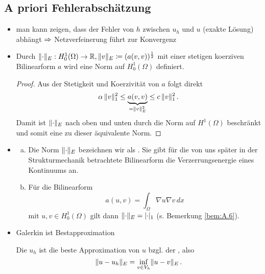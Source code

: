 \subsection{A priori Fehlerabschätzung}
\label{kap:2.3.1}

\begin{itemize}
\item man kann zeigen, dass der Fehler von $h$ zwischen $u_h$ und $u$ (exakte Lösung) abhängt $\Rightarrow$ Netzverfeinerung führt zur Konvergenz

\item \begin{lemma}
Durch $\lVert \cdot\rVert _E: H^1_0(\Omega) \rightarrow \mathbb{R}, \lVert v\rVert_E \coloneqq (a(v,v))^{\frac 1 2}$ mit einer stetigen koerziven Bilinearform $a$ wird eine Norm auf $H_0^1(\Omega)$ definiert.
\end{lemma}

\begin{proof}
Aus der Stetigkeit und Koerzivität von $a$ folgt direkt
\begin{align}\label{eq:2.12}
	\alpha \, \lVert v\rVert_1^2 \le \underbrace{a(v,v)}_{= \lVert v\rVert_E^2} \le c \, \lVert v\rVert_1^2 \, .
\end{align}
Damit ist $\lVert \cdot\rVert_E$ nach oben und unten durch die Norm auf $H^1(\Omega)$ beschränkt und somit eine zu dieser äquivalente Norm.
\end{proof}

\item \begin{bem*}
\begin{enumerate}[(a)]
\item Die Norm $\lVert \cdot\rVert_E$ bezeichnen wir als \textit{}. Sie gibt für die von uns später in der Strukturmechanik betrachtete Bilinearform  die Verzerrungsenergie eines Kontinuums an.
\item Für die Bilinearform
\[
	a(u,v) = \int_\Omega \nabla u \nabla v \, dx
\]
mit $u,v \in H^1_0(\Omega)$ gilt dann $\lVert \cdot\rVert_E = \lvert \cdot\rvert_1$ (s. Bemerkung \ref{bem:A.6}).
\end{enumerate}
\end{bem*}

\item Galerkin ist Bestapproximation
\begin{satz}\label{satz:2.26}
Die  $u_h$ ist die beste Approximation von $u$ bzgl. der , also
\[
	\lVert u-u_h\rVert_E = \inf_{v \in V_h} \lVert u-v\rVert_E \, .
\]
\end{satz}


\end{itemize}

